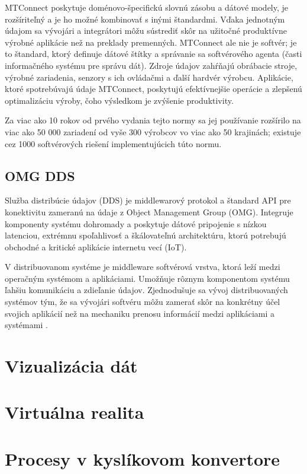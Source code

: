 \documentclass[]{tukediphc}
\begin{document}
MTConnect poskytuje doménovo-špecifickú slovnú zásobu a dátové modely, je rozšíriteľný a je ho možné kombinovať s inými štandardmi. Vďaka jednotným údajom sa vývojári a integrátori môžu sústrediť skôr na užitočné produktívne výrobné aplikácie než na preklady premenných. MTConnect ale nie je softvér; je to štandard, ktorý definuje dátové štítky a správanie sa softvérového agenta (časti informačného systému pre správu dát). Zdroje údajov zahŕňajú obrábacie stroje, výrobné zariadenia, senzory s ich ovládačmi a ďalší hardvér výrobcu. Aplikácie, ktoré spotrebúvajú údaje MTConnect, poskytujú efektívnejšie operácie a zlepšenú optimalizáciu výroby, čoho výsledkom je zvýšenie produktivity.

Za viac ako 10 rokov od prvého vydania tejto normy sa jej používanie rozšírilo na viac ako 50 000 zariadení od vyše 300 výrobcov vo viac ako 50 krajinách; existuje cez 1000 softvérových riešení implementujúcich túto normu.

\subsection{OMG DDS}

Služba distribúcie údajov (DDS) je middlewarový protokol a štandard API pre konektivitu zameranú na údaje z Object Management Group (OMG). Integruje komponenty systému dohromady a poskytuje dátové pripojenie s nízkou latenciou, extrémnu spoľahlivosť a škálovateľnú architektúru, ktorú potrebujú obchodné a kritické aplikácie internetu vecí (IoT).

V distribuovanom systéme je middleware softvérová vrstva, ktorá leží medzi operačným systémom a aplikáciami. Umožňuje rôznym komponentom systému ľahšiu komunikáciu a zdieľanie údajov. Zjednodušuje sa vývoj distribuovaných systémov tým, že sa vývojári softvéru môžu zamerať skôr na konkrétny účel svojich aplikácií než na mechaniku prenosu informácií medzi aplikáciami a systémami \citep{ddsfoundation}.

\section{Vizualizácia dát}


\section{Virtuálna realita}





\section{Procesy v kyslíkovom konvertore}
\end{document}
